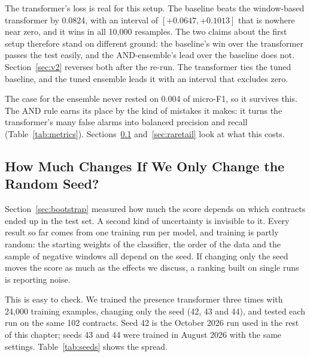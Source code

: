 The transformer's loss is real for this setup. The baseline beats the window-based transformer by 0.0824, with an interval of $[+0.0647, +0.1013]$ that is nowhere near zero, and it wins in all 10{,}000 resamples. The two claims about the first setup therefore stand on different ground: the baseline's win over the transformer passes the test easily, and the AND-ensemble's lead over the baseline does not. Section~\ref{sec:v2} reverses both after the re-run. The transformer ties the tuned baseline, and the tuned ensemble leads it with an interval that excludes zero.

The case for the ensemble never rested on 0.004 of micro-F1, so it survives this. The AND rule earns its place by the kind of mistakes it makes: it turns the transformer's many false alarms into balanced precision and recall (Table~\ref{tab:metrics}). Sections~\ref{sec:seeds} and~\ref{sec:raretail} look at what this costs.
\subsection{How Much Changes If We Only Change the Random Seed?}
\label{sec:seeds}
Section~\ref{sec:bootstrap} measured how much the score depends on which contracts ended up in the test set. A second kind of uncertainty is invisible to it. Every result so far comes from one training run per model, and training is partly random: the starting weights of the classifier, the order of the data and the sample of negative windows all depend on the seed. If changing only the seed moves the score as much as the effects we discuss, a ranking built on single runs is reporting noise.

This is easy to check. We trained the presence transformer three times with 24{,}000 training examples, changing only the seed (42, 43 and 44), and tested each run on the same 102 contracts. Seed 42 is the October 2026 run used in the rest of this chapter; seeds 43 and 44 were trained in August 2026 with the same settings. Table~\ref{tab:seeds} shows the spread.

